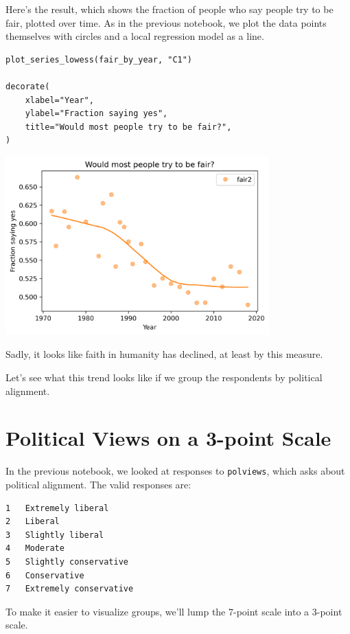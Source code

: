 Here's the result, which shows the fraction of people who say people try
to be fair, plotted over time. As in the previous notebook, we plot the
data points themselves with circles and a local regression model as a
line.

\begin{lstlisting}[]
plot_series_lowess(fair_by_year, "C1")

decorate(
    xlabel="Year",
    ylabel="Fraction saying yes",
    title="Would most people try to be fair?",
)
\end{lstlisting}

\begin{center}
\includegraphics[width=4in]{chapters/03_outlook_files/03_outlook_31_0.png}
\end{center}

Sadly, it looks like faith in humanity has declined, at least by this
measure.

Let's see what this trend looks like if we group the respondents by
political alignment.

\hypertarget{political-views-on-a-3-point-scale}{%
\section{Political Views on a 3-point
Scale}\label{political-views-on-a-3-point-scale}}

In the previous notebook, we looked at responses to
\passthrough{\lstinline!polviews!}, which asks about political
alignment. The valid responses are:

\begin{lstlisting}
1   Extremely liberal
2   Liberal
3   Slightly liberal
4   Moderate
5   Slightly conservative
6   Conservative
7   Extremely conservative
\end{lstlisting}

To make it easier to visualize groups, we'll lump the 7-point scale into
a 3-point scale.

